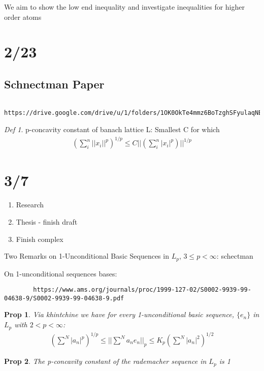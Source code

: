 \documentclass[11pt]{article}
\newtheorem{prop}{Prop}
\theoremstyle{remark}
\newtheorem*{defi}{Def}
\begin{document}
\begin{remark}
	We aim to show the low end inequality and investigate inequalities for higher order atoms
\end{remark}

\section{2/23}

\subsection{Schnectman Paper}

\begin{verbatim}
	https://drive.google.com/drive/u/1/folders/1OK0OkTe4mmz6BoTzghSFyulaqNEpw1ML
\end{verbatim}

\begin{defi}
	p-concavity constant of banach lattice L: Smallest C for which
	\begin{align*}
		(\sum_i^n ||x_i||^p)^{1/p} \leq C ||(\sum_i^n |x_i|^p)||^{1/p}
	\end{align*}
\end{defi}


\section{3/7}

\begin{enumerate}
	\item Research
	\item Thesis - finish draft
	\item Finish complex
\end{enumerate}

\begin{remark}
	Two Remarks on 1-Unconditional Basic Sequences in $L_p$, $3 \leq p < \infty$: schectman
\end{remark}

\begin{remark}
	On 1-unconditional sequences bases: 
	\begin{verbatim}
		https://www.ams.org/journals/proc/1999-127-02/S0002-9939-99-04638-9/S0002-9939-99-04638-9.pdf
	\end{verbatim}
\end{remark}

\begin{prop}
	Via khintchine we have for every 1-unconditional basic sequence, $\{e_n\}$ in $L_p$ with $2 < p < \infty$:
	\begin{align*}
		(\sum^N |a_n|^p)^{1/p} \leq || \sum^N a_n e_n||_p \leq K_p (\sum^N |a_n|^2)^{1/2}
	\end{align*}
\end{prop}

\begin{prop}
	The p-concavity constant of the rademacher sequence in $L_p$ is 1
\end{prop}
\end{document}

